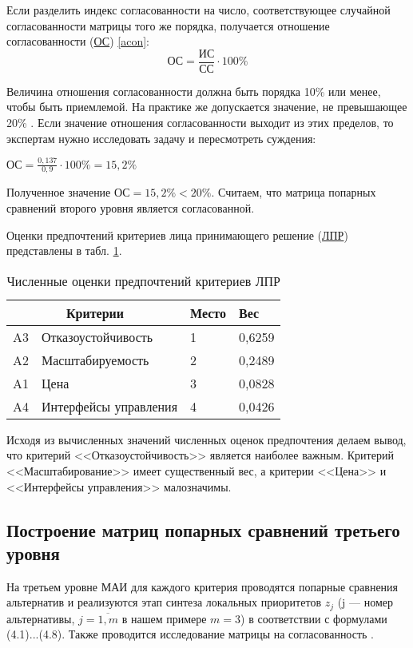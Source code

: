 Если разделить индекс согласованности на число, соответствующее случайной согласованности матрицы того же порядка, получается отношение согласованности (\hyperlink{ots}{ОС}) \ref{acon}:
\begin{equation}\label{acon}
\text{ОС} = \frac{\text{ИС}}{\text{СС}} \cdot 100\%
\end{equation}

Величина отношения согласованности должна быть порядка 10\% или менее, чтобы быть приемлемой.
На практике же допускается значение, не превышающее 20\% \cite{mai}.
Если значение отношения согласованности выходит из этих пределов, то экспертам нужно исследовать задачу и пересмотреть суждения:

$\text{ОС} = \frac{0,137}{0,9} \cdot 100\% = 15,2\%$

Полученное значение $\text{ОС} = 15,2\% < 20\%$.
Считаем, что матрица попарных сравнений второго уровня является согласованной.

Оценки предпочтений критериев лица принимающего решение (\hyperlink{lpr}{ЛПР}) представлены в табл. \ref{marks}.
\begin{table}[H]
  \caption{Численные оценки предпочтений критериев ЛПР}\label{marks}
  \begin{tabular}{|l|l|l|l|}
  \hline \multicolumn{2}{|c|}{Критерии} & Место & Вес \\
  \hline A3 & Отказоустойчивость & 1 & 0,6259 \\
  \hline A2 & Масштабируемость & 2 & 0,2489 \\
  \hline A1 & Цена & 3 & 0,0828 \\
  \hline A4 & Интерфейсы управления & 4 & 0,0426 \\
  \hline
  \end{tabular}
\end{table}

Исходя из вычисленных значений численных оценок предпочтения делаем вывод, что критерий <<Отказоустойчивость>> является наиболее важным.
Критерий <<Масштабирование>> имеет существенный вес, а критерии <<Цена>> и <<Интерфейсы управления>> малозначимы.

\subsection{Построение матриц попарных сравнений третьего уровня}

На третьем уровне МАИ для каждого критерия проводятся попарные сравнения альтернатив и реализуются этап синтеза локальных приоритетов $z_j$ (j --- номер альтернативы, $j = \overline{1,m}$ в нашем примере $m = 3$) в соответствии с
формулами (4.1)...(4.8).
Также проводится исследование матрицы на согласованность \cite{var-analyz}.

